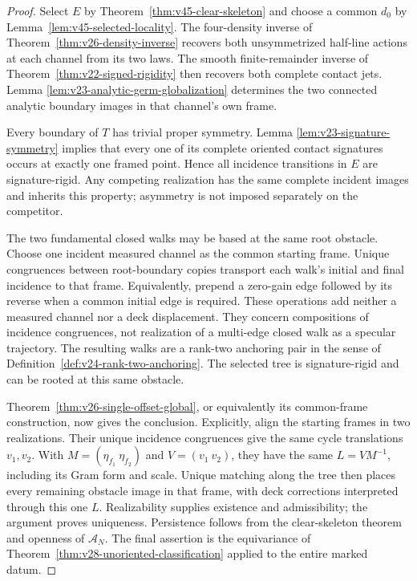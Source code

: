 \begin{proof}
Select $E$ by Theorem~\ref{thm:v45-clear-skeleton} and choose a common
$d_0$ by Lemma~\ref{lem:v45-selected-locality}.  The four-density inverse
of Theorem~\ref{thm:v26-density-inverse} recovers both unsymmetrized
half-line actions at each channel from its two laws.  The smooth
finite-remainder inverse of Theorem~\ref{thm:v22-signed-rigidity} then
recovers both complete contact jets.  Lemma
\ref{lem:v23-analytic-germ-globalization} determines the two connected
analytic boundary images in that channel's own frame.

Every boundary of $T$ has trivial proper symmetry.  Lemma
\ref{lem:v23-signature-symmetry} implies that every one of its complete
oriented contact signatures occurs at exactly one framed point.  Hence
all incidence transitions in $E$ are signature-rigid.  Any competing
realization has the same complete incident images and inherits this
property; asymmetry is not imposed separately on the competitor.

The two fundamental closed walks may be based at the same root obstacle.
Choose one incident measured channel as the common starting frame.
Unique congruences between root-boundary copies transport each walk's
initial and final incidence to that frame.  Equivalently, prepend a
zero-gain edge followed by its reverse when a common initial edge is
required.  These operations add neither a measured channel nor a deck
displacement.  They concern compositions of incidence congruences, not
realization of a multi-edge closed walk as a specular trajectory.
The resulting walks are a rank-two anchoring pair in the sense of
Definition~\ref{def:v24-rank-two-anchoring}.  The selected tree is
signature-rigid and can be rooted at this same obstacle.

Theorem~\ref{thm:v26-single-offset-global}, or equivalently its
common-frame construction, now gives the conclusion.  Explicitly, align
the starting frames in two realizations.  Their unique incidence
congruences give the same cycle translations $v_1,v_2$.  With
$M=(\eta_{f_1}\ \eta_{f_2})$ and $V=(v_1\ v_2)$, they have the same
$L=VM^{-1}$, including its Gram form and scale.  Unique matching along
the tree then places every remaining obstacle image in that frame, with
deck corrections interpreted through this one $L$.  Realizability
supplies existence and admissibility; the argument proves uniqueness.
Persistence follows from the clear-skeleton theorem and openness of
$\mathscr A_N$.  The final assertion is the equivariance of
Theorem~\ref{thm:v28-unoriented-classification} applied to the entire
marked datum.
\end{proof}

